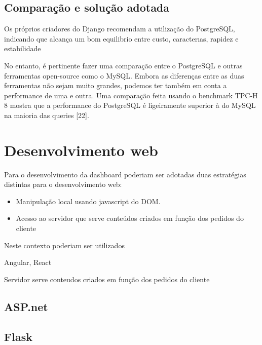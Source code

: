 \subsection{Comparação e solução adotada}


Os próprios criadores do Django recomendam a utilização do PostgreSQL, indicando que alcança um bom equilibrio entre custo, caracterıas, rapidez e estabilidade




No entanto, é pertinente fazer uma comparação entre o PostgreSQL e
outras ferramentas open-source como o MySQL. Embora as diferenças entre
as duas ferramentas não sejam muito grandes, podemos ter também em conta
a performance de uma e outra. Uma comparação feita usando o benchmark
TPC-H 8 mostra que a performance do PostgreSQL é ligeiramente superior à
do MySQL na maioria das queries [22].



\newpage
\section{Desenvolvimento web}



Para o desenvolvimento da dashboard poderiam ser adotadas duas estratégias distintas para o desenvolvimento web: 

\begin{itemize}
	\item Manipulação local usando javascript do DOM. 
	
	\item Acesso ao servidor que serve conteúdos criados em função dos pedidos do cliente
	
\end{itemize}



Neste contexto poderiam ser utilizados 


Angular, React

Servidor serve conteudos criados em função dos pedidos do cliente 







\subsection{ASP.net}

\subsection{Flask}

